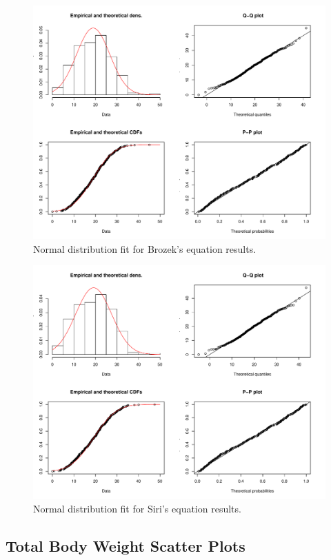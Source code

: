 \documentclass[11pt,american,american]{article}
\begin{document}
\vspace*{\fill}
\begin{figure}[H]
	\centering
	\includegraphics[width=0.8\linewidth]{Images/FIGURES/brozek_fitdist}
	\caption{Normal distribution fit for Brozek's equation results.}
	\label{fig:brozek_fitdist}
\end{figure}

\begin{figure}[H]
	\centering
	\includegraphics[width=0.8\linewidth]{Images/FIGURES/siri_fitdist}
	\caption{Normal distribution fit for Siri's equation results.}
	\label{fig:siri_fitdist}
\end{figure}
\vspace*{\fill}

\newpage


\subsection{Total Body Weight Scatter Plots}
\end{document}
